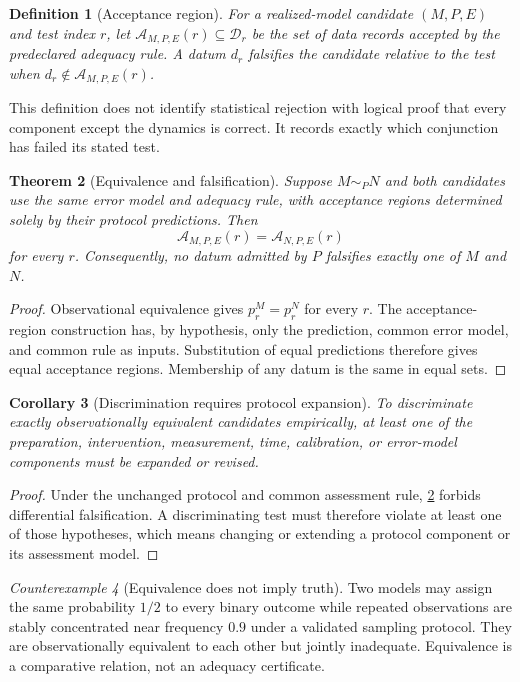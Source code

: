 \documentclass[11pt]{article}
\newtheorem{definition}{Definition}[section]
\newtheorem{theorem}[definition]{Theorem}
\newtheorem{corollary}[definition]{Corollary}
\theoremstyle{remark}
\newtheorem{counterexample}[definition]{Counterexample}
\begin{document}
\begin{definition}[Acceptance region]\label{def:accept}
For a realized-model candidate $(M,P,E)$ and test index $r$, let $\mathcal A_{M,P,E}(r)\subseteq\mathcal D_r$ be the set of data records accepted by the predeclared adequacy rule.  A datum $d_r$ falsifies the candidate relative to the test when $d_r\notin\mathcal A_{M,P,E}(r)$.
\end{definition}
This definition does not identify statistical rejection with logical proof that every component except the dynamics is correct.  It records exactly which conjunction has failed its stated test.

\begin{theorem}[Equivalence and falsification]\label{thm:falsification}
Suppose $M\sim_PN$ and both candidates use the same error model and adequacy rule, with acceptance regions determined solely by their protocol predictions.  Then
\[
 \mathcal A_{M,P,E}(r)=\mathcal A_{N,P,E}(r)
\]
for every $r$.  Consequently, no datum admitted by $P$ falsifies exactly one of $M$ and $N$.
\end{theorem}
\begin{proof}
Observational equivalence gives $p^M_r=p^N_r$ for every $r$.  The acceptance-region construction has, by hypothesis, only the prediction, common error model, and common rule as inputs.  Substitution of equal predictions therefore gives equal acceptance regions.  Membership of any datum is the same in equal sets.
\end{proof}

\begin{corollary}[Discrimination requires protocol expansion]\label{cor:expand}
To discriminate exactly observationally equivalent candidates empirically, at least one of the preparation, intervention, measurement, time, calibration, or error-model components must be expanded or revised.
\end{corollary}
\begin{proof}
Under the unchanged protocol and common assessment rule, \cref{thm:falsification} forbids differential falsification.  A discriminating test must therefore violate at least one of those hypotheses, which means changing or extending a protocol component or its assessment model.
\end{proof}

\begin{counterexample}[Equivalence does not imply truth]
Two models may assign the same probability $1/2$ to every binary outcome while repeated observations are stably concentrated near frequency $0.9$ under a validated sampling protocol.  They are observationally equivalent to each other but jointly inadequate.  Equivalence is a comparative relation, not an adequacy certificate.
\end{counterexample}
\end{document}
